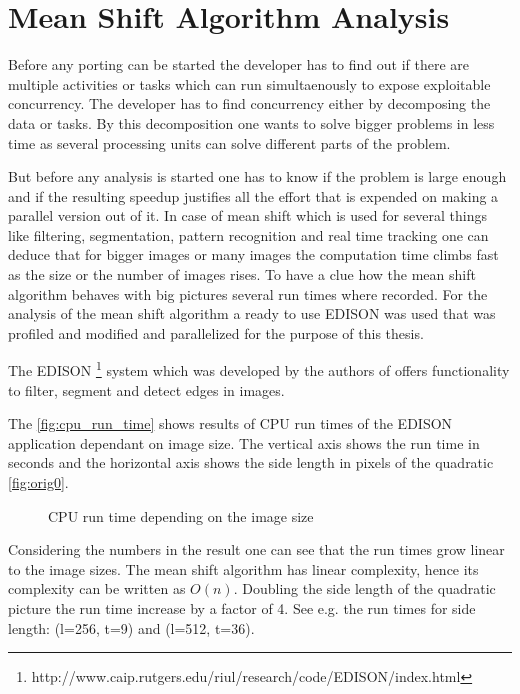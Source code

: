 \chapter{Mean Shift Algorithm Analysis} %
\label{cha:algorithm_analysis}
Before any porting can be started the developer has to find out if there are 
multiple activities or tasks which can run simultaenously to expose exploitable 
concurrency. The developer has to find concurrency either by decomposing the  
data or tasks. By this decomposition one wants to solve bigger problems in less 
time as several processing units can solve different parts of the problem. 

But before any analysis is started one has to know if the problem is large enough
and if the resulting speedup justifies all the effort that is expended on making
a parallel version out of it. In case of mean shift which is used for several 
things like filtering, segmentation, pattern recognition and real time tracking
one can deduce that for bigger images or many images the computation time climbs
fast as the size or the number of images rises. To have a clue how the mean 
shift algorithm behaves with big pictures several run times where recorded.
For the analysis of the mean shift algorithm a ready to use \gls{EDISON} 
was used that was profiled and modified and parallelized for the purpose of this 
thesis.

The
 \gls{EDISON} \footnote{http://www.caip.rutgers.edu/riul/research/code/EDISON/index.html}
system which was developed by the authors  \citeauthor{citeulike:462300} of
\citep{citeulike:462300} offers functionality to filter, segment and detect
edges in images. 

The \autoref{fig:cpu_run_time}
shows results of \gls{CPU} run times of the \gls{EDISON} application dependant
on image size. The vertical axis shows the run time in seconds and the
horizontal axis shows the side length in pixels of the quadratic \autoref{fig:orig0}.
\begin{figure}[ht]
\centering
{}%
\caption{CPU run time depending on the image size}\label{fig:cpu_run_time}%
\end{figure}
Considering the numbers in the result one can see that the run times grow 
linear to the image sizes. The mean shift algorithm has linear complexity, 
hence its complexity can be written as $O(n)$. Doubling the side length of 
the quadratic picture the run time increase by a factor of 4. See e.g.
the run times for side length: (l=256, t=9) and (l=512, t=36). 

